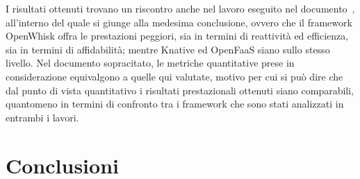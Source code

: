 \documentclass[12pt,a4paper,openany,twoside]{book}
\begin{document}
\noindent
I risultati ottenuti trovano un riscontro anche nel lavoro eseguito nel documento~\cite{Palade2019}, all'interno del quale si giunge alla medesima conclusione, ovvero che il framework OpenWhisk offra le prestazioni peggiori, sia in termini di reattività ed efficienza, sia in termini di affidabilità; mentre Knative ed OpenFaaS siano sullo stesso livello. Nel documento sopracitato, le metriche quantitative prese in considerazione equivalgono a quelle qui valutate, motivo per cui si può dire che dal punto di vista quantitativo i risultati prestazionali ottenuti siano comparabili, quantomeno in termini di confronto tra i framework che sono stati analizzati in entrambi i lavori.


\chapter{Conclusioni}
\label{chap:conclusioni}
\end{document}
